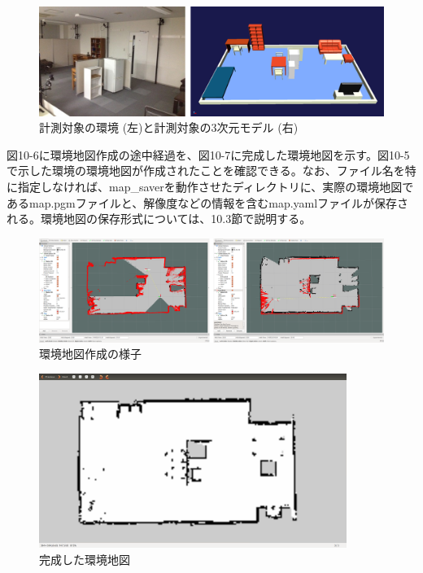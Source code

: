 \begin{figure}[htp]
  \centering
  \includegraphics[width=12cm]{pictures/chapter10/pic_10_05.png}
  \caption{計測対象の環境 (左)と計測対象の3次元モデル (右)}
\end{figure}

図10-6に環境地図作成の途中経過を、図10-7に完成した環境地図を示す。図10-5で示した環境の環境地図が作成されたことを確認できる。なお、ファイル名を特に指定しなければ、map\_saverを動作させたディレクトリに、実際の環境地図であるmap.pgmファイルと、解像度などの情報を含むmap.yamlファイルが保存される。環境地図の保存形式については、10.3節で説明する。

\begin{figure}[htp]
  \centering
  \includegraphics[width=12cm]{pictures/chapter10/pic_10_06.png}
  \caption{環境地図作成の様子}
\end{figure}

\begin{figure}[htp]
  \centering
  \includegraphics[width=10cm]{pictures/chapter10/pic_10_07.png}
  \caption{完成した環境地図}
\end{figure}

